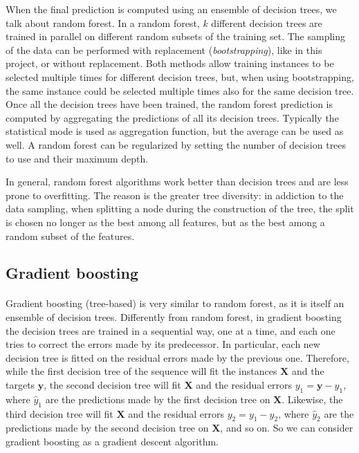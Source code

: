 When the final prediction is computed using an ensemble of decision trees, we talk about random forest. In a random forest, $k$ different decision trees are trained in parallel on different random subsets of the training set. The sampling of the data can be performed with replacement (\textit{bootstrapping}), like in this project, or without replacement. Both methods allow training instances to be selected multiple times for different decision trees, but, when using bootstrapping, the same instance could be selected multiple times also for the same decision tree. Once all the decision trees have been trained, the random forest prediction is computed by aggregating the predictions of all its decision trees. Typically the statistical mode is used as aggregation function, but the average can be used as well. A random forest can be regularized by setting the number of decision trees to use and their maximum depth.

In general, random forest algorithms work better than decision trees and are less prone to overfitting. The reason is the greater tree diversity: in addiction to the data sampling, when splitting a node during the construction of the tree, the split is chosen no longer as the best among all features, but as the best among a random subset of the features.

\subsection{Gradient boosting}
\paragraph{} Gradient boosting (tree-based) is very similar to random forest, as it is itself an ensemble of decision trees. Differently from random forest, in gradient boosting the decision trees are trained in a sequential way, one at a time, and each one tries to correct the errors made by its predecessor. In particular, each new decision tree is fitted on the residual errors made by the previous one. Therefore, while the first decision tree of the sequence will fit the instances $\mathbf{X}$ and the targets $\mathbf{y}$, the second decision tree will fit $\mathbf{X}$ and the residual errors $y_1 = \mathbf{y} - \hat{y}_1$, where $\hat{y}_1$ are the predictions made by the first decision tree on $\mathbf{X}$. Likewise, the third decision tree will fit $\mathbf{X}$ and the residual errors $y_2 = y_1 - \hat{y}_2$, where $\hat{y}_2$ are the predictions made by the second decision tree on $\mathbf{X}$, and so on. So we can consider gradient boosting as a gradient descent algorithm.

